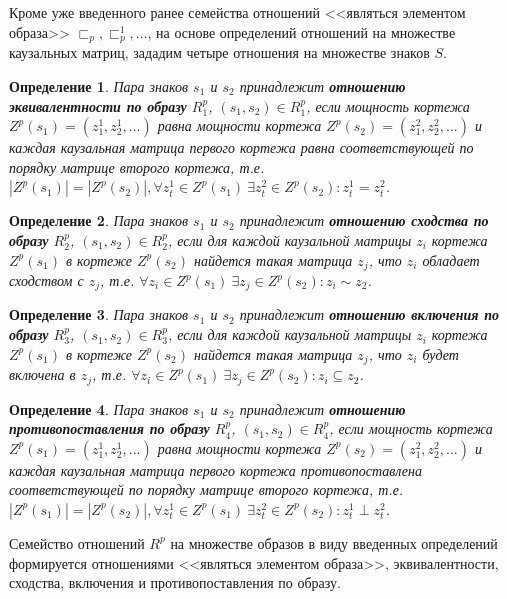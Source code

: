\documentclass[12pt]{scrartcl}
\newtheorem{definition}{Определение}
\begin{document}
	Кроме уже введенного ранее семейства отношений <<являться элементом образа>> ${\sqsubset_p,\sqsubset_p^1,\dots}$, на основе определений отношений на множестве каузальных матриц, зададим четыре отношения на множестве знаков $S$.
	\begin{definition}
		Пара знаков  $s_1$ и $s_2$ принадлежит \textbf{отношению эквивалентности по образу} $R_1^p$, $(s_1,s_2)\in R_1^p$, если мощность кортежа $Z^p(s_1)=(z_1^1,z_2^1,...)$ равна мощности кортежа $Z^p(s_2)=(z_1^2,z_2^2,...)$ и каждая каузальная матрица первого кортежа равна соответствующей по порядку матрице второго кортежа, т.е. $|Z^p(s_1)| = |Z^p(s_2)|, \forall z_t^1\in Z^p(s_1)\ \exists z_t^2\in Z^p(s_2): z_t^1=z_t^2$.
	\end{definition}
	
	\begin{definition}\label{def:sim}
		Пара знаков  $s_1$ и $s_2$ принадлежит \textbf{отношению сходства по образу} $R_2^p$, $(s_1,s_2)\in R_2^p$, если для каждой каузальной матрицы $z_i$ кортежа $Z^p(s_1)$ в кортеже $Z^p(s_2)$ найдется такая матрица $z_j$, что $z_i$ обладает сходством с $z_j$, т.е. $\forall z_i\in Z^p(s_1)\ \exists z_j\in Z^p(s_2): z_i\sim z_2$.
	\end{definition}
	
	\begin{definition}
		Пара знаков  $s_1$ и $s_2$ принадлежит \textbf{отношению включения по образу} $R_3^p$, $(s_1,s_2)\in R_3^p$, если для каждой каузальной матрицы $z_i$ кортежа $Z^p(s_1)$ в кортеже $Z^p(s_2)$ найдется такая матрица $z_j$, что $z_i$ будет включена в $z_j$, т.е. $\forall z_i\in Z^p(s_1)\ \exists z_j\in Z^p(s_2): z_i\subseteq z_2$.
	\end{definition}

	\begin{definition}
		Пара знаков  $s_1$ и $s_2$ принадлежит \textbf{отношению противопоставления по образу} $R_4^p$, $(s_1,s_2)\in R_4^p$, если мощность кортежа $Z^p(s_1)=(z_1^1,z_2^1,...)$ равна мощности кортежа $Z^p(s_2)=(z_1^2,z_2^2,...)$ и каждая каузальная матрица первого кортежа противопоставлена соответствующей по порядку матрице второго кортежа, т.е. $|Z^p(s_1)| = |Z^p(s_2)|, \forall z_t^1\in Z^p(s_1)\ \exists z_t^2\in Z^p(s_2): z_t^1\perp z_t^2$.
	\end{definition}
	
	Семейство отношений $R^p$ на множестве образов в виду введенных определений формируется отношениями <<являться элементом образа>>, эквивалентности, сходства, включения и противопоставления по образу.
		
\end{document}
